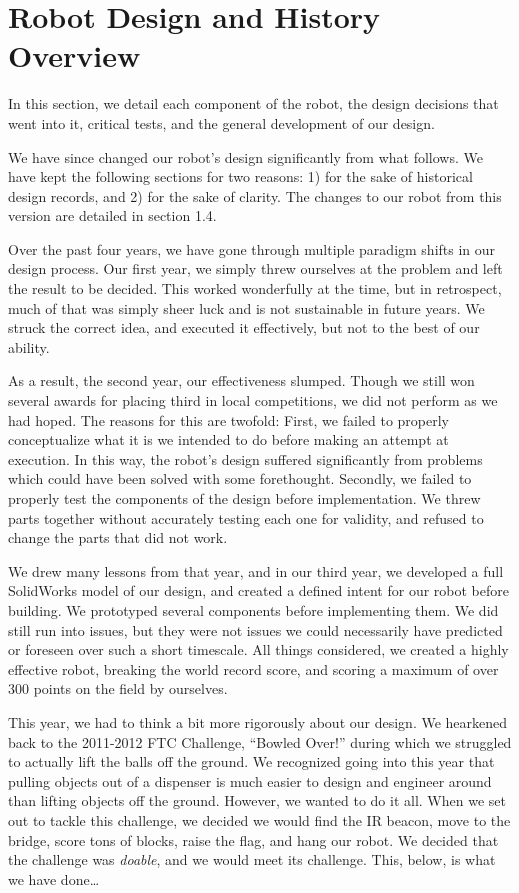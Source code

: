 \section{Robot Design and History Overview}
In this section, we detail each component of the robot, the design decisions that went into it, critical tests, and the general development of our design.

We have since changed our robot's design significantly from what follows. We have kept the following sections for two reasons: 1) for the sake of historical design records, and 2) for the sake of clarity. The changes to our robot from this version are detailed in section 1.4.

Over the past four years, we have gone through multiple paradigm shifts in our design process. Our first year, we simply threw ourselves at the problem and left the result to be decided. This worked wonderfully at the time, but in retrospect, much of that was simply sheer luck and is not sustainable in future years. We struck the correct idea, and executed it effectively, but not to the best of our ability. 
	
As a result, the second year, our effectiveness slumped. Though we still won several awards for placing third in local competitions, we did not perform as we had hoped. The reasons for this are twofold: First, we failed to properly conceptualize what it is we intended to do before making an attempt at execution. In this way, the robot's design suffered significantly from problems which could have been solved with some forethought. Secondly, we failed to properly test the components of the design before implementation. We threw parts together without accurately testing each one for validity, and refused to change the parts that did not work.

We drew many lessons from that year, and in our third year, we developed a full SolidWorks model of our design, and created a defined intent for our robot before building. We prototyped several components before implementing them. We did still run into issues, but they were not issues we could necessarily have predicted or foreseen over such a short timescale. All things considered, we created a highly effective robot, breaking the world record score, and scoring a maximum of over 300 points on the field by ourselves.

This year, we had to think a bit more rigorously about our design. We hearkened back to the 2011-2012 FTC Challenge, ``Bowled Over!'' during which we struggled to actually lift the balls off the ground. We recognized going into this year that pulling objects out of a dispenser is much easier to design and engineer around than lifting objects off the ground. However, we wanted to do it all. When we set out to tackle this challenge, we decided we would find the IR beacon, move to the bridge, score tons of blocks, raise the flag, and hang our robot. We decided that the challenge was \textit{doable}, and we would meet its challenge. This, below, is what we have done\ldots

